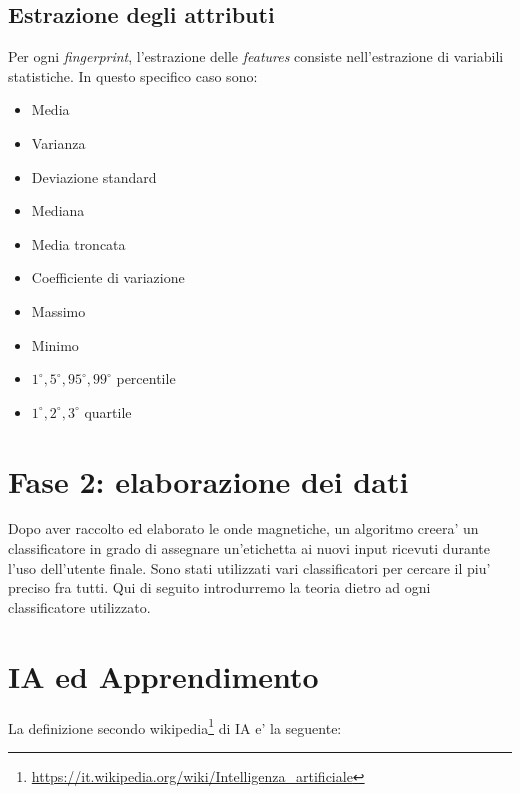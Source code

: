 \subsection{Estrazione degli attributi}
Per ogni \textit{fingerprint}, l'estrazione delle \textit{features} consiste nell'estrazione di variabili statistiche. In questo specifico caso sono:
\begin{itemize}
	\item Media
	\item Varianza
	\item Deviazione standard
	\item Mediana
	\item Media troncata
	\item Coefficiente di variazione
	\item Massimo
	\item Minimo
	\item $ 1^{\circ}, 5^{\circ}, 95^{\circ}, 99^{\circ} $ percentile
	\item $ 1^{\circ}, 2^{\circ}, 3^{\circ} $ quartile
\end{itemize}





\section{Fase 2: elaborazione dei dati}

Dopo aver raccolto ed elaborato le onde magnetiche, un algoritmo creera' un classificatore in grado di assegnare un'etichetta ai nuovi input ricevuti durante l'uso dell'utente finale.
Sono stati utilizzati vari classificatori per cercare il piu' preciso fra tutti. Qui di seguito introdurremo la teoria dietro ad ogni classificatore utilizzato.
\newpage
\section{IA ed Apprendimento}
La definizione secondo wikipedia\footnote{\url{https://it.wikipedia.org/wiki/Intelligenza_artificiale}} di IA e' la seguente:\\

